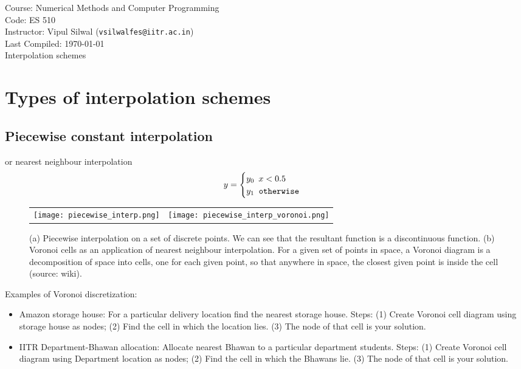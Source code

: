 \documentclass[11pt,titlepage,fleqn]{article}
\begin{document}
\noindent Course: Numerical Methods and Computer Programming\\
\noindent Code: ES 510\\
\noindent Instructor: Vipul Silwal (\verb+vsilwalfes@iitr.ac.in+) \\ 
\noindent Last Compiled: \today \\

{\huge Interpolation schemes}

\tableofcontents

\section{Types of interpolation schemes}

\subsection{Piecewise constant interpolation}
or nearest neighbour interpolation
\begin{equation}
y = \begin{cases}
y_0 \,\,\, x < 0.5\\
y_1 \verb+ otherwise+
\end{cases}
\end{equation}

\begin{figure}[H]
\begin{tabular}{cc}
\texttt{[image: piecewise\_interp.png]}&
\texttt{[image: piecewise\_interp\_voronoi.png]}\\
\end{tabular}
\caption{(a) Piecewise interpolation on a set of discrete points. We can see that the resultant function is a discontinuous function. (b) Voronoi cells as an application of nearest neighbour interpolation. For a given set of points in space, a Voronoi diagram is a decomposition of space into cells, one for each given point, so that anywhere in space, the closest given point is inside the cell (source: wiki).}
\end{figure}

Examples of Voronoi discretization:
\begin{itemize}
\item Amazon storage house: For a particular delivery location find the nearest storage house. Steps: (1) Create Voronoi cell diagram using storage house as nodes; (2) Find the cell in which the location lies. (3) The node of that cell is your solution.
\item IITR Department-Bhawan allocation: Allocate nearest Bhawan to a particular department students. Steps: (1) Create Voronoi cell diagram using Department location as nodes; (2) Find the cell in which the Bhawans lie. (3) The node of that cell is your solution.
\end{itemize}
\end{document}
